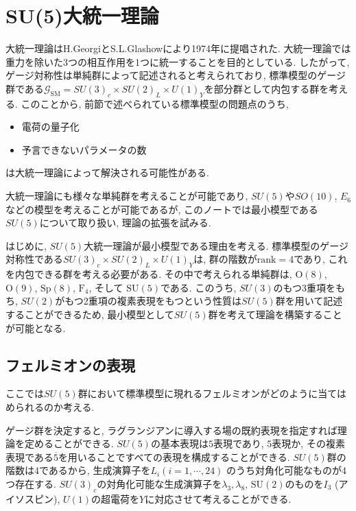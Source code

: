 %
%
\chapter{SU(5)大統一理論}
大統一理論はH.GeorgiとS.L.Glashowにより1974年に提唱された\cite{PhysRevLett.32.438}.
大統一理論では重力を除いた3つの相互作用を1つに統一することを目的としている.
したがって, ゲージ対称性は単純群によって記述されると考えられており, 標準模型のゲージ群である$\mathcal{G}_\text{SM}= SU(3)_c\times SU(2)_L\times U(1)_Y$を部分群として内包する群を考える.
このことから, 前節で述べられている標準模型の問題点のうち,
\begin{itemize}
  \item 電荷の量子化
  \item 予言できないパラメータの数
\end{itemize}
は大統一理論によって解決される可能性がある.

大統一理論にも様々な単純群を考えることが可能であり, $SU(5)$や$SO(10)$, $E_6$などの模型を考えることが可能であるが, このノートでは最小模型である$SU(5)$について取り扱い, 理論の拡張を試みる.

はじめに, $SU(5)$大統一理論が最小模型である理由を考える.
標準模型のゲージ対称性である$SU(3)_c\times SU(2)_L\times U(1)_Y$は, 群の階数が$\text{rank}=4$であり, これを内包できる群を考える必要がある.
その中で考えられる単純群は, $\text{O}(8)$, $\mathrm{O}(9)$, $\mathrm{Sp}(8)$, $\mathrm{F}_4$, そして $\mathrm{SU}(5)$である.
このうち, $SU(3)$のもつ3重項をもち, $SU(2)$がもつ2重項の複素表現をもつという性質は$SU(5)$群を用いて記述することができるため, 最小模型として$SU(5)$群を考えて理論を構築することが可能となる.

\section{フェルミオンの表現}
ここでは$SU(5)$群において標準模型に現れるフェルミオンがどのように当てはめられるのか考える.

ゲージ群を決定すると, ラグランジアンに導入する場の既約表現を指定すれば理論を定めることができる.
$SU(5)$の基本表現は$5$表現であり, $5$表現か, その複素表現である$\overline{5}$を用いることですべての表現を構成することができる.
$SU(5)$群の階数は4であるから, 生成演算子を$L_i$$(i=1,\cdots,24)$ のうち対角化可能なものが4つ存在する.
$SU(3)_c$の対角化可能な生成演算子を$\lambda_3,\lambda_8$, $\mathrm{SU}(2)$のものを$I_3$ (アイソスピン), $U(1)$の超電荷を$Y$に対応させて考えることができる.

